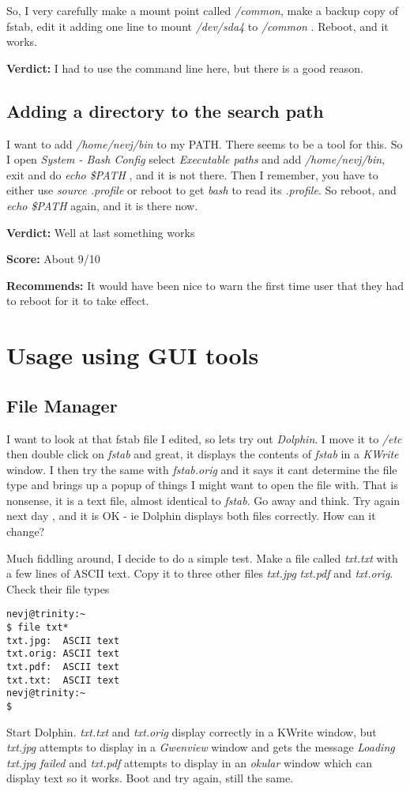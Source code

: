\documentclass{article}  %
\begin{document}
So, I very carefully make a mount point called {\em /common}, make a backup copy of fstab, edit it adding one line to mount {\em /dev/sda4} to {\em /common} . Reboot, and it works. 

{\bf Verdict:} I had to use the command line here, but there is a good reason.

\subsection{Adding a directory to the search path}
I want to add {\em /home/nevj/bin} to my PATH. There seems to be a tool for this. So I open {\em System - Bash Config} select {\em Executable paths} and add {\em /home/nevj/bin}, exit and do {\em echo \$PATH} , and it is not there. 
Then I remember, you have to either use {\em source .profile} or reboot to get {\em bash} to read its {\em .profile}. So reboot, and {\em echo \$PATH} again, and it is there now. 

{\bf Verdict:} Well at last something works

{\bf Score:} About 9/10

{\bf Recommends:} It would have been nice to warn the first time user that they had to reboot for it to take effect.

\section{Usage using GUI tools}

\subsection{File Manager}
I want to look at that fstab file I edited, so lets try out {\em Dolphin}. I move it to {\em /etc} then double click on {\em fstab} and great, it displays the contents of {\em fstab} in a {\em KWrite} window. I then try the same with {\em fstab.orig} and it says it cant determine the file type and brings up a popup of things I might want to open the file with. That is nonsense, it is a text file, almost identical to {\em fstab}.  Go away and think. Try again next day , and it is OK - ie Dolphin displays both files correctly. How can it change?

Much fiddling around, I decide to do a simple test. Make a file called {\em txt.txt} with a few lines of ASCII text. Copy it to three other files {\em txt.jpg} {\em txt.pdf} and {\em txt.orig}. Check their file types
\begin{verbatim}
nevj@trinity:~
$ file txt*
txt.jpg:  ASCII text
txt.orig: ASCII text
txt.pdf:  ASCII text
txt.txt:  ASCII text
nevj@trinity:~
$ 
\end{verbatim}
Start Dolphin. {\em txt.txt} and {\em txt.orig} display correctly in a KWrite window, but {\em txt.jpg} attempts to display in a {\em Gwenview} window and gets the message {\em Loading txt.jpg failed} and {\em txt.pdf} attempts to display in an {\em okular} window which can display text so it works. Boot and try again, still the same.
\end{document}
